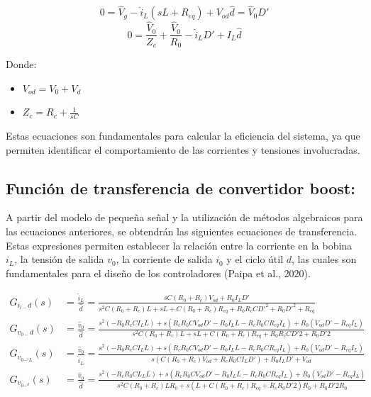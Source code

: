 \[0 = \hat{V}_g - \hat{i}_L(sL + R_{eq}) + V_{od} \hat{d} = \hat{V}_0 D'\]
\[0 = \frac{\hat{V}_0}{Z_c} + \frac{\hat{V}_0}{R_0} - \hat{i}_L D' + I_L \hat{d}\]

Donde:
\begin{itemize}
	\item \(V_{od} = V_0 + V_d\)
	\item \(Z_c = R_c + \frac{1}{sC}\)
\end{itemize}

Estas ecuaciones son fundamentales para calcular la eficiencia del sistema, ya que permiten identificar
el comportamiento de las corrientes y tensiones involucradas.

\subsection*{Función de transferencia de convertidor boost:}
A partir del modelo de pequeña señal y la utilización de métodos algebraicos para las ecuaciones
anteriores, se obtendrán las siguientes ecuaciones de transferencia. Estas expresiones permiten
establecer la relación entre la corriente en la bobina \(i_L\), la tensión de salida \(v_0\), la corriente de salida \(i_0\)
y el ciclo útil \(d\), las cuales son fundamentales para el diseño de los controladores (Paipa et al., 2020).

\begin{align*}
	G_{i_{l-} d}(s)   & = \frac{\hat{i}_L}{\hat{d}} = \frac{sC(R_0 + R_c)V_{od} + R_0 I_L D'}{s^2 C(R_0 + R_c)L + sL + C(R_0 + R_c)R_{eq} + R_0 R_c C D'^2 + R_0 D'^2 + R_{eq}}                                                                                \\
	G_{v_{0-} d}(s)   & = \frac{\hat{v}_0}{\hat{d}} = \frac{s^2(-R_0 R_c C I_L L) + s( R_c R_0 C V_{od} D' - R_0 I_L L - R_c R_0  C R_{eq} I_L) + R_0(V_{od} D' - R_{eq} I_L)}{s^2 C(R_0 + R_c)L + sL + C(R_0 + R_c)R_{eq} + R_0 R_c C D'2 + R_0 D'2}          \\
	G_{v_{0-^i L}}(s) & = \frac{\hat{v}_0}{\hat{i}_L} = \frac{s^2(-R_0 R_c C I_L L) + s( R_c R_0 C V_{od} D' - R_0 I_L L - R_c R_0  C R_{eq} I_L) + R_0(V_{od} D' - R_{eq} I_L)}{s(C(R_0 + R_c)V_{od} +  R_c R_0 CI_LD') + R_0I_LD' + V_{od}}                  \\
	G_{v_{0-^d}}(s)   & = \frac{\hat{v}_0}{\hat{d}} = \frac{s^2(-R_c R_0 C L_L L) + s( R_c R_0 C V_{od} D' - R_0 I_L L - R_c R_0  C R_{eq} I_L) + R_0(V_{od} D' - R_{eq} I_L)}{s^2 C(R_0 + R_c)LR_0 + s(L + C(R_0 + R_c)R_{eq} + R_c R_0D'2)R_0 + R_0 D'2 R_0} \\
\end{align*}

